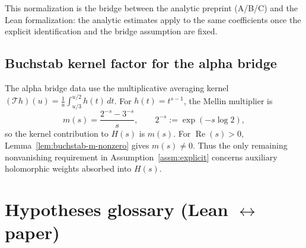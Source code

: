 \documentclass[11pt]{article}
\theoremstyle{plain}
\theoremstyle{definition}
\newcommand{\Rea}{\operatorname{Re}}
\begin{document}
This normalization is the bridge between the analytic preprint (A/B/C) and the
Lean formalization: the analytic estimates apply to the same coefficients once
the explicit identification and the bridge assumption are fixed.

\subsection*{Buchstab kernel factor for the alpha bridge}\label{app:buchstab-kernel}
The alpha bridge data use the multiplicative averaging kernel
$(\mathcal{T}h)(u)=\frac{1}{u}\int_{u/3}^{u/2} h(t)\,dt$. For $h(t)=t^{s-1}$,
the Mellin multiplier is
\[
  m(s)=\frac{2^{-s}-3^{-s}}{s}, \qquad 2^{-s}:=\exp(-s\log 2),
\]
so the kernel contribution to $H(s)$ is $m(s)$. For $\Rea(s)>0$,
Lemma~\ref{lem:buchstab-m-nonzero} gives $m(s)\neq 0$. Thus the only remaining
nonvanishing requirement in Assumption~\ref{assm:explicit} concerns auxiliary
holomorphic weights absorbed into $H(s)$.

\section{Hypotheses glossary (Lean \texorpdfstring{$\leftrightarrow$}{<->} paper)}\label{sec:hypotheses-glossary}
\end{document}
